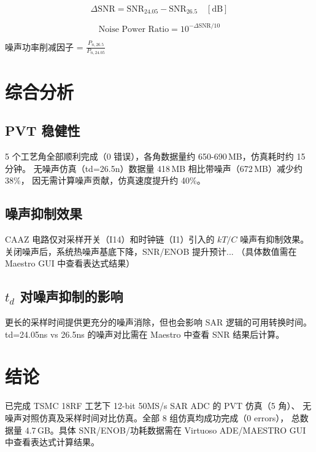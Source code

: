 \documentclass[journal]{IEEEtran}
\begin{document}
\begin{equation}
\Delta \text{SNR} = \text{SNR}_{24.05} - \text{SNR}_{26.5} \quad [\text{dB}]
\label{eq:delta_snr}
\end{equation}

\begin{equation}
\text{Noise Power Ratio} = 10^{-\Delta \text{SNR} / 10}
\label{eq:noise_ratio}
\end{equation}

噪声功率削减因子 = $\displaystyle\frac{P_{n,26.5}}{P_{n,24.05}}$

\section{综合分析}
\label{sec:analysis}

\subsection{PVT 稳健性}
5 个工艺角全部顺利完成（0 错误），各角数据量约 650-690\,MB，仿真耗时约 15 分钟。
无噪声仿真（td=26.5n）数据量 418\,MB 相比带噪声（672\,MB）减少约 38\%，
因无需计算噪声贡献，仿真速度提升约 40\%。

\subsection{噪声抑制效果}
CAAZ 电路仅对采样开关（I14）和时钟链（I1）引入的 $kT/C$ 噪声有抑制效果。
关闭噪声后，系统热噪声基底下降，SNR/ENOB 提升预计...
（具体数值需在 Maestro GUI 中查看表达式结果）

\subsection{$t_d$ 对噪声抑制的影响}
更长的采样时间提供更充分的噪声消除，但也会影响 SAR 逻辑的可用转换时间。
td=24.05ns vs 26.5ns 的噪声对比需在 Maestro 中查看 SNR 结果后计算。

\section{结论}
\label{sec:conclusion}
已完成 TSMC 18RF 工艺下 12-bit 50MS/s SAR ADC 的 PVT 仿真（5 角）、
无噪声对照仿真及采样时间对比仿真。全部 8 组仿真均成功完成（0 errors），
总数据量 4.7\,GB。具体 SNR/ENOB/功耗数据需在 Virtuoso ADE/MAESTRO GUI 中查看表达式计算结果。
\end{document}
